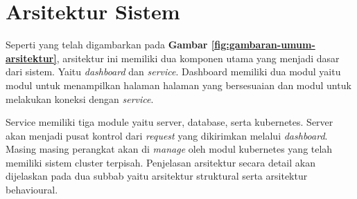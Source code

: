 \section{Arsitektur Sistem}
Seperti yang telah digambarkan pada \textbf{Gambar \ref{fig:gambaran-umum-arsitektur}}, arsitektur ini memiliki dua komponen utama yang menjadi dasar dari sistem. Yaitu \textit{dashboard} dan \textit{service}. Dashboard memiliki dua modul yaitu modul untuk menampilkan halaman halaman yang bersesuaian dan modul untuk melakukan koneksi dengan \textit{service}.

Service memiliki tiga module yaitu server, database, serta kubernetes. Server akan menjadi pusat kontrol dari \textit{request} yang dikirimkan melalui \textit{dashboard}. Masing masing perangkat akan di \textit{manage} oleh modul kubernetes yang telah memiliki sistem cluster terpisah. Penjelasan arsitektur secara detail akan dijelaskan pada dua subbab yaitu arsitektur struktural serta arsitektur behavioural.



